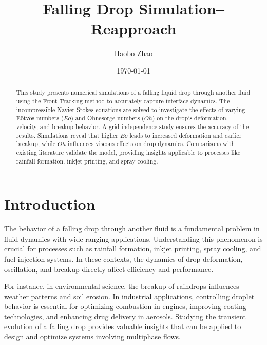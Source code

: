 \documentclass[12pt]{article}
\title{Falling Drop Simulation--Reapproach}
\author{Haobo Zhao}
\date{\today}
\begin{document}
\maketitle


\begin{abstract}
This study presents numerical simulations of a falling liquid drop through another fluid using the Front Tracking method to accurately capture interface dynamics. The incompressible Navier-Stokes equations are solved to investigate the effects of varying Eötvös numbers ($Eo$) and Ohnesorge numbers ($Oh$) on the drop's deformation, velocity, and breakup behavior. A grid independence study ensures the accuracy of the results. Simulations reveal that higher $Eo$ leads to increased deformation and earlier breakup, while $Oh$ influences viscous effects on drop dynamics. Comparisons with existing literature validate the model, providing insights applicable to processes like rainfall formation, inkjet printing, and spray cooling.
\end{abstract}




\section{Introduction}

The behavior of a falling drop through another fluid is a fundamental problem in fluid dynamics with wide-ranging applications. Understanding this phenomenon is crucial for processes such as rainfall formation, inkjet printing, spray cooling, and fuel injection systems. In these contexts, the dynamics of drop deformation, oscillation, and breakup directly affect efficiency and performance.

For instance, in environmental science, the breakup of raindrops influences weather patterns and soil erosion. In industrial applications, controlling droplet behavior is essential for optimizing combustion in engines, improving coating technologies, and enhancing drug delivery in aerosols. Studying the transient evolution of a falling drop provides valuable insights that can be applied to design and optimize systems involving multiphase flows.
\end{document}
